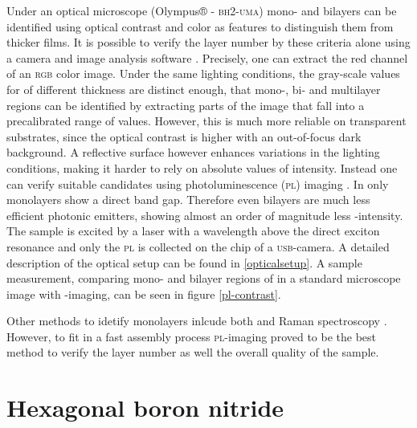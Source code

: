 Under an optical microscope (Olympus® - \textsc{bh}2-\textsc{uma}) mono- and bilayers can be identified using optical contrast and color as features to distinguish them from thicker films. It is possible to verify the layer number by these criteria alone using a camera and image analysis software \cite{funk_spectroscopy_2017}. Precisely, one can extract the red channel of an \textsc{rgb} color image. Under the same lighting conditions, the gray-scale values for \tmds of different thickness are distinct enough, that mono-, bi- and multilayer regions can be identified by extracting parts of the image that fall into a precalibrated range of values. However, this is much more reliable on transparent substrates, since the optical contrast is higher with an out-of-focus dark background. A reflective surface however enhances variations in the lighting conditions, making it harder to rely on absolute values of intensity. Instead one can verify suitable candidates using photoluminescence (\textsc{pl}) imaging \cite{neumann_opto-valleytronic_2017}. In \tmds only monolayers show a direct band gap. Therefore even bilayers are much less efficient photonic emitters, showing almost an order of magnitude less \pl\!-intensity. The sample is excited by a laser with a wavelength above the direct exciton resonance and only the \textsc{pl} is collected on the chip of a \textsc{usb}-camera. A detailed description of the optical setup can be found in \ref{opticalsetup}. A sample measurement, comparing mono- and bilayer regions of \wse in a standard microscope image with \pl\!-imaging, can be seen in figure \ref{pl-contrast}. 

Other methods to idetify monolayers inlcude both \pl and Raman spectroscopy \cite{zhao_lattice_2013,zhang_phonon_2015,tonndorf_photoluminescence_2013}. However, to fit in a fast assembly process \textsc{pl}-imaging proved to be the best method to verify the layer number as well the overall quality of the sample.

\section{Hexagonal boron nitride}

